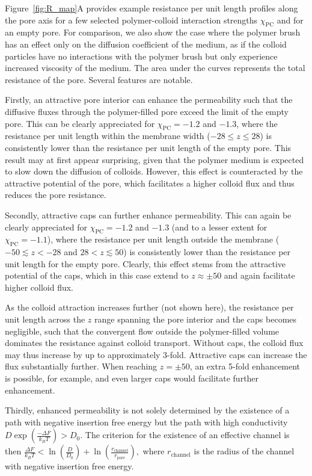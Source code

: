 \documentclass[12pt, a4paper]{article}
\begin{document}
Figure~\ref{fig:R_map}A provides example resistance per unit length profiles along the pore axis for a few selected polymer-colloid interaction strengths $\chi_{\textrm{PC}}$ and for an empty pore. 
For comparison, we also show the case where the polymer brush has an effect only on the diffusion coefficient of the medium, as if the colloid particles have no interactions with the polymer brush but only experience increased viscosity of the medium.
The area under the curves represents the total resistance of the pore.
Several features are notable. 

Firstly, an attractive pore interior can enhance the permeability such that the diffusive fluxes through the polymer-filled pore exceed the limit of the empty pore.
This can be clearly appreciated for $\chi_{\textrm{PC}} = -1.2$ and $-1.3$, where the resistance per unit length within the membrane width ($-28 \leq z \leq 28$) is consistently lower than the resistance per unit length of the empty pore.
This result may at first appear surprising, given that the polymer medium is expected to slow down the diffusion of colloids.
However, this effect is counteracted by the attractive potential of the pore, which facilitates a higher colloid flux and thus reduces the pore resistance.

Secondly, attractive caps can further enhance permeability.
This can again be clearly appreciated for $\chi_{\textrm{PC}} = -1.2$ and $-1.3$ (and to a lesser extent for $\chi_{\textrm{PC}} = -1.1$), where the resistance per unit length outside the membrane ($-50 \lesssim z < -28$ and $28 < z \lesssim 50$) is consistently lower than the resistance per unit length for the empty pore. 
Clearly, this effect stems from the attractive potential of the caps, which in this case extend to $z \approx \pm 50$ and again facilitate higher colloid flux. 

As the colloid attraction increases further (not shown here), the resistance per unit length across the $z$ range spanning the pore interior and the caps becomes negligible, such that the convergent flow outside the polymer-filled volume dominates the resistance against colloid transport.
Without caps, the colloid flux may thus increase by up to approximately 3-fold. 
Attractive caps can increase the flux substantially further.
When reaching $z = \pm 50$, an extra 5-fold enhancement is possible, for example, and even larger caps would facilitate further enhancement.

Thirdly, enhanced permeability is not solely determined by the existence of a path with negative insertion free energy but the path with high conductivity $D\exp(\frac{-\Delta F}{k_B T})>D_0$. The criterion for the existence of an effective channel is then
$
\frac{\Delta F}{k_B T} < \ln\left( \frac{D}{D_0} \right) + \ln\left( \frac{r_{\textrm{channel}}}{r_{\textrm{pore}}} \right),
$
where $r_{\textrm{channel}}$ is the radius of the channel with negative insertion free energy.
\end{document}

